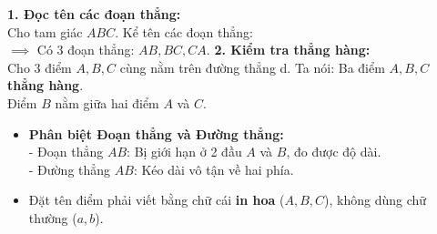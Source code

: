 \documentclass[11pt,a4paper]{article}
\begin{document}
\vspace{-1.5mm}
\noindent
\begin{minipage}[t]{0.49\textwidth}\vspace{0pt}
\begin{tcolorbox}[
  enhanced,
  colback=green!4!white,
  colframe=green!60!black,
  arc=2mm, boxrule=0.8pt,
  left=2mm, right=2mm, top=1.8mm, bottom=1.8mm,
  title={\footnotesize\bfseries\color{white}\faCheckCircle\ 4. Ví dụ thực hành chuẩn mực}
]
{\footnotesize
\textbf{1. Đọc tên các đoạn thẳng:}\\
Cho tam giác $ABC$. Kể tên các đoạn thẳng:\\
$\implies$ Có $3$ đoạn thẳng: $AB, BC, CA$.
\textbf{2. Kiểm tra thẳng hàng:}\\
Cho 3 điểm $A, B, C$ cùng nằm trên đường thẳng d. Ta nói: Ba điểm $A, B, C$ \textbf{thẳng hàng}.\\
Điểm $B$ nằm giữa hai điểm $A$ và $C$.
}
\end{tcolorbox}
\end{minipage}
\hfill
\begin{minipage}[t]{0.49\textwidth}\vspace{0pt}
\begin{tcolorbox}[
  enhanced,
  colback=red!4!white,
  colframe=red!75!black,
  arc=2mm, boxrule=0.8pt,
  left=2mm, right=2mm, top=1.8mm, bottom=1.8mm,
  title={\footnotesize\bfseries\color{white}\faExclamationTriangle\ 5. Mẹo tránh bẫy trắc nghiệm}
]
{\footnotesize
\begin{itemize}\setlength{\itemsep}{1pt}\setlength{\leftskip}{-2.5mm}
  \item \textbf{Phân biệt Đoạn thẳng và Đường thẳng:}\\
  - Đoạn thẳng $AB$: Bị giới hạn ở 2 đầu $A$ và $B$, đo được độ dài.\\
  - Đường thẳng $AB$: Kéo dài vô tận về hai phía.
  \item Đặt tên điểm phải viết bằng chữ cái \textbf{in hoa} ($A, B, C$), không dùng chữ thường ($a, b$).
\end{itemize}
}
\end{tcolorbox}
\end{minipage}
\end{document}
